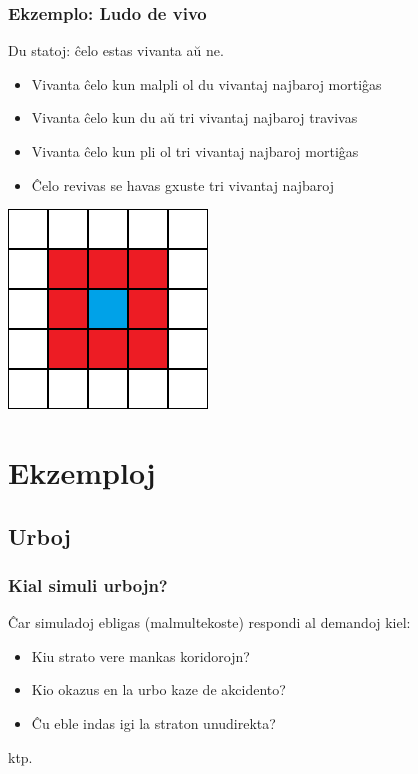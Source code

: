 \documentclass{beamer}
\begin{document}
  
  \begin{frame}
    \frametitle{Ekzemplo: Ludo de vivo}
	Du statoj: ĉelo estas vivanta aŭ ne.
	
	\begin{itemize}
		\item     Vivanta ĉelo kun malpli ol du vivantaj najbaroj mortiĝas
		\item<2-> Vivanta ĉelo kun du aŭ tri vivantaj najbaroj travivas
		\item<2-> Vivanta ĉelo kun pli ol tri vivantaj najbaroj mortiĝas
		\item<2-> Ĉelo revivas se havas gxuste tri vivantaj najbaroj
	\end{itemize}
	\begin{center}
  		\includegraphics[scale=0.6]{CA-Moore}
	\end{center}
  \end{frame}
  
  \section{Ekzemploj}
  \subsection{Urboj}

  \begin{frame}
  \frametitle{Kial simuli urbojn?}
  Ĉar simuladoj ebligas (malmultekoste) respondi al demandoj kiel:
  \begin{itemize}
  	\item Kiu strato vere mankas koridorojn?
  	\item Kio okazus en la urbo kaze de akcidento?
  	\item Ĉu eble indas igi la straton unudirekta?
  \end{itemize}
  ktp.
  \end{frame}  
  
\end{document}
